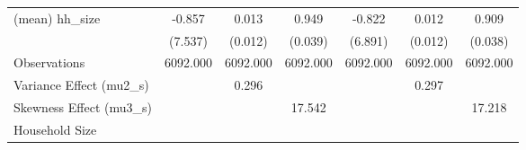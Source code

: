 \begin{table}[htbp]
\begin{tabular}{l*{6}{c}}
(mean) hh\_size  &   -0.857         &    0.013         &    0.949\sym{***}&   -0.822         &    0.012         &    0.909\sym{***}\\
                &  (7.537)         &  (0.012)         &  (0.039)         &  (6.891)         &  (0.012)         &  (0.038)         \\
\midrule
Observations    & 6092.000         & 6092.000         & 6092.000         & 6092.000         & 6092.000         & 6092.000         \\
Variance Effect (mu2\_s)&                  &    0.296         &                  &                  &    0.297         &                  \\
Skewness Effect (mu3\_s)&                  &                  &   17.542         &                  &                  &   17.218         \\
Household Size  &                  &                  &                  &                  &                  &                  \\
\bottomrule
\end{tabular}
\end{table}
